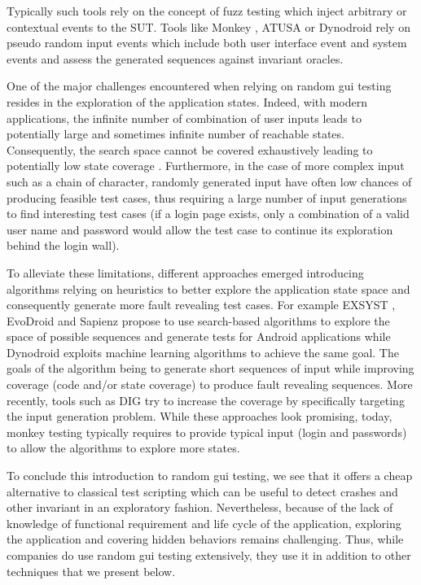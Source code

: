 Typically such tools rely on the concept of fuzz testing which inject arbitrary or contextual events to the SUT. Tools like Monkey \cite{Google2020},  ATUSA \cite{Mesbah2012} or Dynodroid \cite{Machiry2013} rely on pseudo random input events which include both user interface event and system events and assess the generated sequences against invariant oracles. 

One of the major challenges encountered when relying on random \gls{gui} testing resides in the exploration of the application states. Indeed, with modern applications, the infinite number of combination of user inputs leads to potentially large and sometimes infinite number of reachable states. Consequently, the search space cannot be covered exhaustively leading to potentially low state coverage \cite{Canny2019}. Furthermore, in the case of more complex input such as a chain of character, randomly generated input have often low chances of producing feasible test cases, thus requiring a large number of input generations to find interesting test cases (\eg if a login page exists, only a combination of a valid user name and password would allow the test case to continue its exploration behind the login wall).

To alleviate these limitations, different approaches emerged introducing algorithms relying on heuristics to better explore the application state space and consequently generate more fault revealing test cases. For example EXSYST \cite{Gross2012}, EvoDroid \cite{Mahmood2014} and Sapienz \cite{Mao2016} propose to use search-based algorithms to explore the space of possible sequences and generate tests for Android applications while Dynodroid \cite{Machiry2013} exploits machine learning algorithms to achieve the same goal. The goals of the algorithm being to generate short sequences of input while improving coverage (code \cite{Gross2012} and/or state \cite{Machiry2013} coverage) to produce fault revealing sequences. More recently, tools such as DIG \cite{Biagiola2019} try to increase the coverage by specifically targeting the input generation problem. While these approaches look promising, today, monkey testing typically requires to provide typical input (\eg login and passwords) to allow the algorithms to explore more states.

To conclude this introduction to random \gls{gui} testing, we see that it offers a cheap alternative to classical test scripting which can be useful to detect crashes and other invariant in an exploratory fashion. Nevertheless, because of the lack of knowledge of functional requirement and life cycle of the application, exploring the application and covering hidden behaviors remains challenging. Thus, while companies do use random \gls{gui} testing extensively, they use it in addition to other techniques that we present below.

